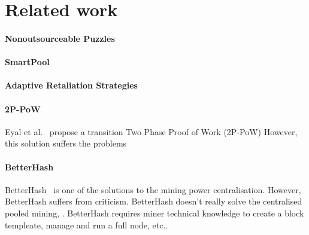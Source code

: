 \section{Related work}


\paragraph{Nonoutsourceable Puzzles}

\paragraph{SmartPool}

\paragraph{Adaptive Retaliation Strategies}

\paragraph{2P-PoW}
Eyal et al.~\cite{2P-PoW} propose a 
transition
Two Phase Proof of Work (2P-PoW)
However,
this solution suffers the problems 


\paragraph{BetterHash}
BetterHash~\cite{draft-bip-BetterHash} is one of the solutions to the mining power centralisation.
However, BetterHash suffers from criticism.
BetterHash doesn't really solve the centralised pooled mining, .
BetterHash requires miner technical knowledge to create a block templeate, manage and run a full node, etc..
